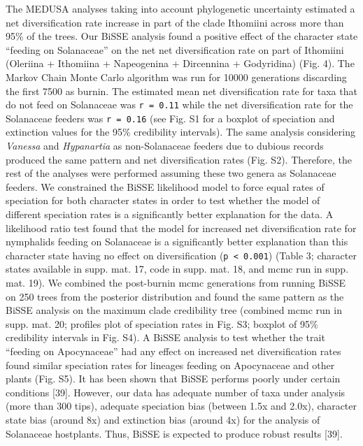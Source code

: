 \documentclass[]{article}
\begin{document}
The MEDUSA analyses taking into account phylogenetic uncertainty
estimated a net diversification rate increase in part of the clade
Ithomiini across more than 95\% of the trees. Our BiSSE analysis found a
positive effect of the character state ``feeding on Solanaceae'' on the
net net diversification rate on part of Ithomiini (Oleriina + Ithomiina
+ Napeogenina + Dircennina + Godyridina) (Fig. 4). The Markov Chain
Monte Carlo algorithm was run for 10000 generations discarding the first
7500 as burnin. The estimated mean net diversification rate for taxa
that do not feed on Solanaceae was \texttt{r = 0.11} while the net
diversification rate for the Solanaceae feeders was \texttt{r = 0.16}
(see Fig. S1 for a boxplot of speciation and extinction values for the
95\% credibility intervals). The same analysis considering
\emph{Vanessa} and \emph{Hypanartia} as non-Solanaceae feeders due to
dubious records produced the same pattern and net diversification rates
(Fig. S2). Therefore, the rest of the analyses were performed assuming
these two genera as Solanaceae feeders. We constrained the BiSSE
likelihood model to force equal rates of speciation for both character
states in order to test whether the model of different speciation rates
is a significantly better explanation for the data. A likelihood ratio
test found that the model for increased net diversification rate for
nymphalids feeding on Solanaceae is a significantly better explanation
than this character state having no effect on diversification
(\texttt{p \textless{} 0.001}) (Table 3; character states available in
supp. mat. 17, code in supp. mat. 18, and mcmc run in supp. mat. 19). We
combined the post-burnin mcmc generations from running BiSSE on 250
trees from the posterior distribution and found the same pattern as the
BiSSE analysis on the maximum clade credibility tree (combined mcmc run
in supp. mat. 20; profiles plot of speciation rates in Fig. S3; boxplot
of 95\% credibility intervals in Fig. S4). A BiSSE analysis to test
whether the trait ``feeding on Apocynaceae'' had any effect on increased
net diversification rates found similar speciation rates for lineages
feeding on Apocynaceae and other plants (Fig. S5). It has been shown
that BiSSE performs poorly under certain conditions {[}39{]}. However,
our data has adequate number of taxa under analysis (more than 300
tips), adequate speciation bias (between 1.5x and 2.0x), character state
bias (around 8x) and extinction bias (around 4x) for the analysis of
Solanaceae hostplants. Thus, BiSSE is expected to produce robust results
{[}39{]}.
\end{document}
